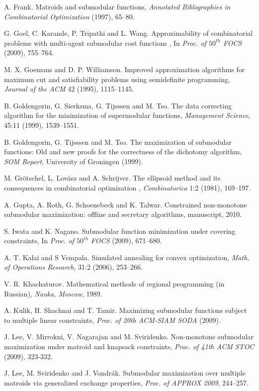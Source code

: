 \documentclass{article}[11pt]
\begin{document}
\begin{thebibliography}{99}
 A. Frank.
Matroids and submodular functions,
{\em Annotated Biblographies in Combinatorial Optimization} (1997), 65--80.

 G. Goel, C. Karande, P. Tripathi and L. Wang.
Approximability of combinatorial problems with multi-agent submodular cost functions ,
In {\em Proc. of $50^{th}$ FOCS} (2009), 755--764.

 M. X. Goemans and D. P. Williamson.
Improved approximation algorithms for maximum cut and satisfiability problems
using semidefinite programming, {\em Journal of the ACM} 42 (1995), 1115--1145.

 B. Goldengorin, G. Sierksma, G. Tijsssen and M. Tso.
The data correcting algorithm for the minimization of supermodular functions,
{\em Management Science}, 45:11 (1999), 1539--1551.

 B. Goldengorin, G. Tijsssen and M. Tso.
The maximization of submodular functions: Old and new proofs for the
correctness of the dichotomy algorithm, {\em SOM Report},
University of Groningen (1999).

 M. Gr\"{o}tschel, L. Lov\'asz and A. Schrijver.
The ellipsoid method and its consequences in combinatorial optimization ,
{\em Combinatorica} 1:2 (1981), 169--197.

 A. Gupta, A. Roth, G. Schoenebeck and K. Talwar.
Constrained non-monotone submodular maximization: offline and secretary algorithms,
manuscript, 2010.

 S. Iwata and K. Nagano.
Submodular function minimization under covering constraints,
In {\em Proc. of $50^{th}$ FOCS} (2009), 671--680.

 A. T. Kalai and S Vempala.
Simulated annealing for convex optimization,
{\em Math. of Operations Research}, 31:2 (2006), 253--266.

 V. R. Khachaturov.
Mathematical methods of regional programming (in Russian),
{\em Nauka, Moscow}, 1989.

 A. Kulik, H. Shachnai and T. Tamir.
Maximizing submodular functions subject to multiple linear constraints,
\emph{Proc. of 20th ACM-SIAM SODA} (2009).

 J. Lee, V. Mirrokni, V. Nagarajan and M. Sviridenko.
Non-monotone submodular maximization under matroid and knapsack constraints,
 \emph{Proc. of 41th ACM STOC} (2009), 323-332.

 J. Lee, M. Sviridenko and J. Vondr\'ak.
Submodular maximization over multiple matroids via generalized exchange properties,
{\em Proc. of APPROX 2009}, 244--257.


\end{thebibliography}
\end{document}
